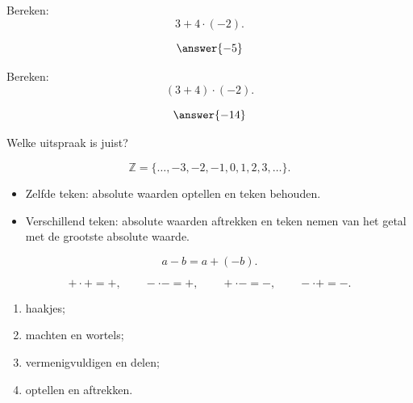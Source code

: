 \documentclass{ximera}
\begin{document}
\begin{problem}
Bereken:
\[
3+4\cdot(-2).
\]

\[
\answer{-5}
\]
\end{problem}

\begin{problem}
Bereken:
\[
(3+4)\cdot(-2).
\]

\[
\answer{-14}
\]
\end{problem}

\begin{problem}
Welke uitspraak is juist?

\begin{multipleChoice}
\end{multipleChoice}
\end{problem}



\[
\mathbb{Z}
=
\{\ldots,-3,-2,-1,0,1,2,3,\ldots\}.
\]


\begin{itemize}
    \item Zelfde teken: absolute waarden optellen en teken behouden.
    \item Verschillend teken: absolute waarden aftrekken en teken nemen van het
    getal met de grootste absolute waarde.
\end{itemize}


\[
a-b=a+(-b).
\]


\[
+\cdot+=+,
\qquad
-\cdot-=+,
\qquad
+\cdot-=-,
\qquad
-\cdot+=-.
\]


\begin{enumerate}
    \item haakjes;
    \item machten en wortels;
    \item vermenigvuldigen en delen;
    \item optellen en aftrekken.
\end{enumerate}
\end{document}
